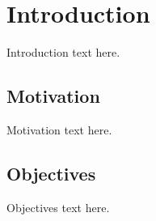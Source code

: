 \chapter{Introduction}

Introduction text here.

\section{Motivation}
Motivation text here.

\section{Objectives}
Objectives text here.
